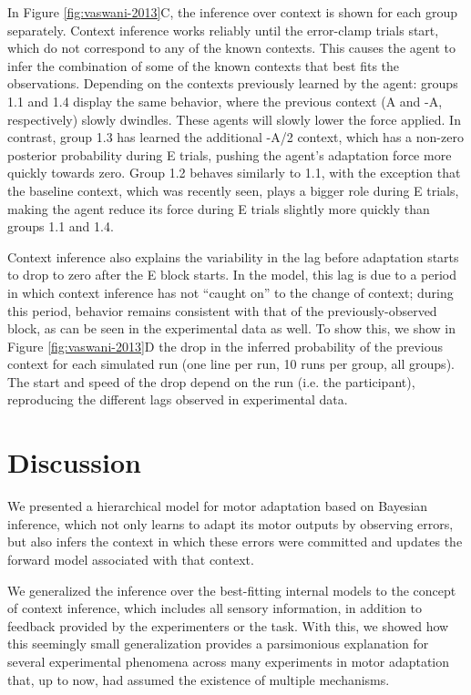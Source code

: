 \documentclass[a4paper,doc,floatsintext,natbib]{apa6}%
\def \fref #1{Figure \ref{#1}}     %
\begin{document}
In \fref{fig:vaswani-2013}C, the inference over context is shown for each group separately. Context inference works reliably until the error-clamp trials start, which do not correspond to any of the known contexts. This causes the agent to infer the combination of some of the known contexts that best fits the observations. Depending on the contexts previously learned by the agent: groups 1.1 and 1.4 display the same behavior, where the previous context (A and -A, respectively) slowly dwindles. These agents will slowly lower the force applied. In contrast, group 1.3 has learned the additional -A/2 context, which has a non-zero posterior probability during E trials, pushing the agent's adaptation force more quickly towards zero. Group 1.2 behaves similarly to 1.1, with the exception that the baseline context, which was recently seen, plays a bigger role during E trials, making the agent reduce its force during E trials slightly more quickly than groups 1.1 and 1.4.

Context inference also explains the variability in the lag before adaptation starts to drop to zero after the E block starts. In the model, this lag is due to a period in which context inference has not ``caught on'' to the change of context; during this period, behavior remains consistent with that of the previously-observed block, as can be seen in the experimental data as well. To show this, we show in \fref{fig:vaswani-2013}D the drop in the inferred probability of the previous context for each simulated run (one line per run, 10 runs per group, all groups). The start and speed of the drop depend on the run (i.e. the participant), reproducing the different lags observed in experimental data.

\section{Discussion}
We presented a hierarchical model for motor adaptation based on Bayesian inference, which not only learns to adapt its motor outputs by observing errors, but also infers the context in which these errors were committed and updates the forward model associated with that context.

We generalized the inference over the best-fitting internal models to the concept of context inference, which includes all sensory information, in addition to feedback provided by the experimenters or the task. With this, we showed how this seemingly small generalization provides a parsimonious explanation for several experimental phenomena across many experiments in motor adaptation that, up to now, had assumed the existence of multiple mechanisms.
\end{document}
